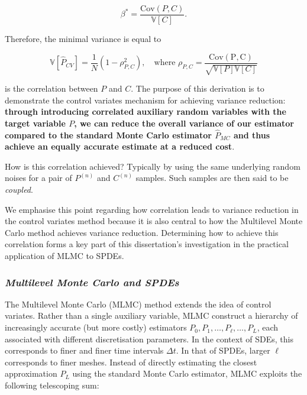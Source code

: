 \begin{equation*}
    \beta^* = \frac{\mathrm{Cov}(P, C)}{\mathbb{V}[C]}.
\end{equation*}

Therefore, the minimal variance is equal to

\begin{equation*}
    \mathbb{V}[\hat{P}_{CV}] = \frac{1}{N} \left(1 - \rho_{P,C}^2\right), 
    \quad \text{where } \rho_{P,C} = \frac{\mathrm{Cov(P,C)}}{\sqrt{\mathbb{V}[P]\mathbb{V}[C]}}
\end{equation*}


is the correlation between $P$ and $C$. The purpose of this derivation is to
demonstrate the control variates mechanism for achieving variance reduction:
\textbf{through introducing correlated auxiliary random variables 
with the target variable $P$, we can reduce the overall variance of our estimator
compared to the standard Monte Carlo estimator $\hat{P}_{MC}$ and thus achieve an 
equally accurate estimate at a reduced cost}.

How is this correlation achieved? Typically by using the same underlying 
random noises for a pair of $P^{(n)}$ and $C^{(n)}$ samples. Such 
samples are then said to be \textit{coupled}.

We emphasise this point regarding how correlation leads to variance 
reduction in the control variates method because it is also central to how the 
Multilevel Monte Carlo method achieves variance reduction. Determining how to 
achieve this correlation forms a key part of this dissertation's investigation
in the practical application of MLMC to SPDEs.


\subsubsection*{\textit{Multilevel Monte Carlo and SPDEs}}

The Multilevel Monte Carlo (MLMC) method extends the 
idea of control variates. Rather than a single 
auxiliary variable, MLMC construct a hierarchy of increasingly accurate 
(but more costly) estimators $P_0, P_1, \dots, P_\ell, \dots, P_L$, each 
associated with different discretisation parameters. In the context of SDEs, this 
corresponds to finer and finer time intervals $\Delta t$. In that of SPDEs, 
larger $\ell$ corresponds to finer meshes. Instead of directly estimating the closest 
approximation $P_L$ using the standard Monte Carlo estimator, MLMC exploits
the following telescoping sum:

